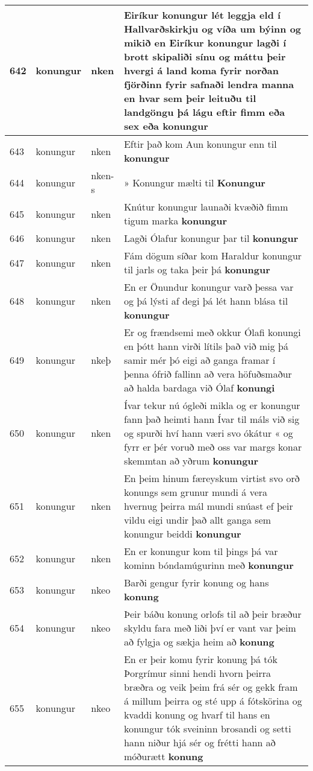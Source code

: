\documentclass{article}
\begin{document}
\begin{longtable}{p{1cm}|p{1cm}|p{1cm}|p{13cm}}
\hline
642&konungur&nken&Eiríkur konungur lét leggja eld í Hallvarðskirkju og víða um býinn og mikið en Eiríkur konungur lagði í brott skipaliði sínu og máttu þeir hvergi á land koma fyrir norðan fjörðinn fyrir safnaði lendra manna en hvar sem þeir leituðu til landgöngu þá lágu eftir fimm eða sex eða \textbf{konungur} \\
\hline
643&konungur&nken&Eftir það kom Aun konungur enn til \textbf{konungur} \\
\hline
644&konungur&nken-s&» Konungur mælti til \textbf{Konungur} \\
\hline
645&konungur&nken&Knútur konungur launaði kvæðið fimm tigum marka \textbf{konungur} \\
\hline
646&konungur&nken&Lagði Ólafur konungur þar til \textbf{konungur} \\
\hline
647&konungur&nken&Fám dögum síðar kom Haraldur konungur til jarls og taka þeir þá \textbf{konungur} \\
\hline
648&konungur&nken&En er Önundur konungur varð þessa var og þá lýsti af degi þá lét hann blása til \textbf{konungur} \\
\hline
649&konungur&nkeþ&Er og frændsemi með okkur Ólafi konungi en þótt hann virði lítils það við mig þá samir mér þó eigi að ganga framar í þenna ófrið fallinn að vera höfuðsmaður að halda bardaga við Ólaf \textbf{konungi} \\
\hline
650&konungur&nken&Ívar tekur nú ógleði mikla og er konungur fann það heimti hann Ívar til máls við sig og spurði hví hann væri svo ókátur « og fyrr er þér voruð með oss var margs konar skemmtan að yðrum \textbf{konungur} \\
\hline
651&konungur&nken&En þeim hinum færeyskum virtist svo orð konungs sem grunur mundi á vera hvernug þeirra mál mundi snúast ef þeir vildu eigi undir það allt ganga sem konungur beiddi \textbf{konungur} \\
\hline
652&konungur&nken&En er konungur kom til þings þá var kominn bóndamúgurinn með \textbf{konungur} \\
\hline
653&konungur&nkeo&Barði gengur fyrir konung og hans \textbf{konung} \\
\hline
654&konungur&nkeo&Þeir báðu konung orlofs til að þeir bræður skyldu fara með liði því er vant var þeim að fylgja og sækja heim að \textbf{konung} \\
\hline
655&konungur&nkeo&En er þeir komu fyrir konung þá tók Þorgrímur sinni hendi hvorn þeirra bræðra og veik þeim frá sér og gekk fram á millum þeirra og sté upp á fótskörina og kvaddi konung og hvarf til hans en konungur tók sveininn brosandi og setti hann niður hjá sér og frétti hann að móðurætt \textbf{konung} \\

\end{longtable}
\end{document}
